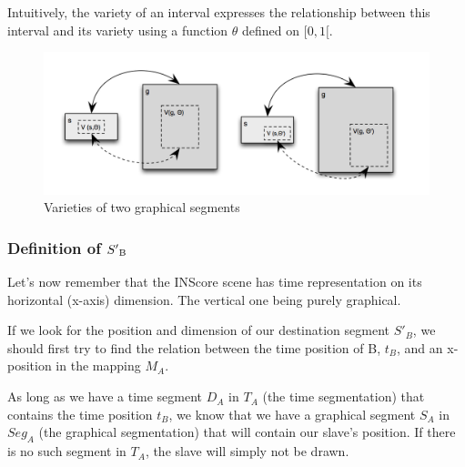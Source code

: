\documentclass[a4paper]{article}
\begin{document}
Intuitively, the variety of an interval expresses the relationship between this interval and its variety using a function $\theta$ defined on $[0, 1[$.
\\
\begin{figure}[h]
\includegraphics[width=15cm]{img/variety.png}
\caption{Varieties of two graphical segments}
\label{fig:variety}
\end{figure}


\subsubsection{Definition of $S'\textsubscript{B}$}\label{subsubsec:defDestRect}


Let's now remember that the INScore scene has time representation on its horizontal (x-axis) dimension. The vertical one being purely graphical.

If we look for the position and dimension of our destination segment $S'_B$, we should first try to find the relation between the time position of B, $t_B$, and an x-position in the mapping $M_A$. 

As long as we have a time segment $D_A$ in $T_A$ (the time segmentation) that contains the time position $t_B$, we know that we have a graphical segment $S_A$ in $Seg_A$ (the graphical segmentation) that will contain our slave's position. If there is no such segment in $T_A$, the slave will simply not be drawn.
\end{document}
